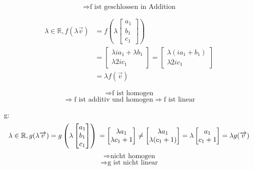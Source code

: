 \documentclass[a4paper, 11pt]{article}
\begin{document}
$$\Rightarrow\text{f ist geschlossen in Addition}$$

\begin{align*}
    \lambda \in \mathbb{R}, f(\lambda\overrightarrow{v}) &= f \left( \lambda\begin{bmatrix} a_1 \\ b_ 1\\ c_1\end{bmatrix} \right) \\
    &= \begin{bmatrix} \lambda ia_1 + \lambda b_1 \\ \lambda 2ic_ 1 \end{bmatrix} = \begin{bmatrix} \lambda(ia_1 + b_1) \\ \lambda 2ic_ 1 \end{bmatrix} \\
    &= \lambda f(\overrightarrow{v})
\end{align*}

$$\Rightarrow\text{f ist homogen}$$
$$\Rightarrow\text{f ist additiv und homogen}\Rightarrow\text{f ist linear}$$

g:
$$\lambda \in \mathbb{R}, g(\lambda\overrightarrow{v}) = g \left( \lambda\begin{bmatrix} a_1 \\ b_ 1\\ c_1\end{bmatrix} \right)  \\
= \begin{bmatrix} \lambda a_1 \\ \lambda c_1 + 1\end{bmatrix} \neq \begin{bmatrix} \lambda a_1 \\ \lambda(c_1 + 1)\end{bmatrix} = \\
\lambda\begin{bmatrix} a_1 \\ c_1 + 1\end{bmatrix} =
\lambda g(\overrightarrow{v})$$
$$\Rightarrow\text{nicht homogen}$$
$$\Rightarrow\text{g ist nicht linear}$$
\end{document}
